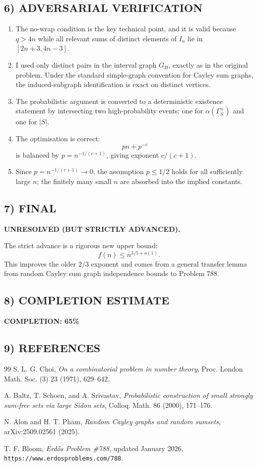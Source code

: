 \subsection*{6) ADVERSARIAL VERIFICATION}
\begin{enumerate}
\item The no-wrap condition is the key technical point, and it is valid because $q>4n$ while all relevant sums of distinct elements of $I_n$ lie in $[2n+3,4n-3]$.
\item I used only distinct pairs in the interval graph $G_B$, exactly as in the original problem. Under the standard simple-graph convention for Cayley sum graphs, the induced-subgraph identification is exact on distinct vertices.
\item The probabilistic argument is converted to a deterministic existence statement by intersecting two high-probability events: one for $\alpha(\Gamma_S^+)$ and one for $|S|$.
\item The optimisation is correct:
\[
 pn + p^{-c}
\]
is balanced by $p=n^{-1/(c+1)}$, giving exponent $c/(c+1)$.
\item Since $p=n^{-1/(c+1)} \to 0$, the assumption $p \le 1/2$ holds for all sufficiently large $n$; the finitely many small $n$ are absorbed into the implied constants.
\end{enumerate}

\subsection*{7) FINAL}
\textbf{UNRESOLVED (BUT STRICTLY ADVANCED).}

The strict advance is a rigorous new upper bound:
\[
 f(n) \le n^{3/5+o(1)}.
\]
This improves the older $2/3$ exponent and comes from a general transfer lemma from random Cayley sum graph independence bounds to Problem 788.

\subsection*{8) COMPLETION ESTIMATE}
\textbf{COMPLETION: 65\%}

\subsection*{9) REFERENCES}
\begin{thebibliography}{99}
S. L. G. Choi,
\emph{On a combinatorial problem in number theory},
Proc. London Math. Soc. (3) 23 (1971), 629--642.

A. Baltz, T. Schoen, and A. Srivastav,
\emph{Probabilistic construction of small strongly sum-free sets via large Sidon sets},
Colloq. Math. 86 (2000), 171--176.

N. Alon and H. T. Pham,
\emph{Random Cayley graphs and random sumsets},
arXiv:2509.02561 (2025).

T. F. Bloom,
\emph{Erd\H{o}s Problem \#788}, updated January 2026,
\texttt{https://www.erdosproblems.com/788}.
\end{thebibliography}
